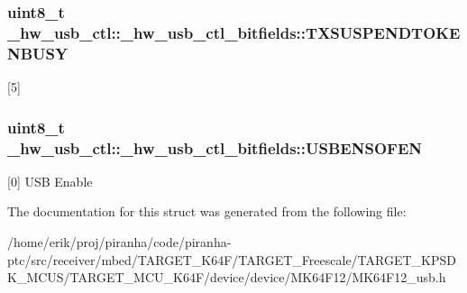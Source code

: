 \subsubsection[{\texorpdfstring{T\+X\+S\+U\+S\+P\+E\+N\+D\+T\+O\+K\+E\+N\+B\+U\+SY}{TXSUSPENDTOKENBUSY}}]{\setlength{\rightskip}{0pt plus 5cm}uint8\+\_\+t \+\_\+hw\+\_\+usb\+\_\+ctl\+::\+\_\+hw\+\_\+usb\+\_\+ctl\+\_\+bitfields\+::\+T\+X\+S\+U\+S\+P\+E\+N\+D\+T\+O\+K\+E\+N\+B\+U\+SY}\hypertarget{struct__hw__usb__ctl_1_1__hw__usb__ctl__bitfields_a598e5316f44ae034098ae7c047238770}{}\label{struct__hw__usb__ctl_1_1__hw__usb__ctl__bitfields_a598e5316f44ae034098ae7c047238770}
\mbox{[}5\mbox{]} 
\subsubsection[{\texorpdfstring{U\+S\+B\+E\+N\+S\+O\+F\+EN}{USBENSOFEN}}]{\setlength{\rightskip}{0pt plus 5cm}uint8\+\_\+t \+\_\+hw\+\_\+usb\+\_\+ctl\+::\+\_\+hw\+\_\+usb\+\_\+ctl\+\_\+bitfields\+::\+U\+S\+B\+E\+N\+S\+O\+F\+EN}\hypertarget{struct__hw__usb__ctl_1_1__hw__usb__ctl__bitfields_aec8cd251acc2ef4f7d8863919c100a56}{}\label{struct__hw__usb__ctl_1_1__hw__usb__ctl__bitfields_aec8cd251acc2ef4f7d8863919c100a56}
\mbox{[}0\mbox{]} U\+SB Enable 

The documentation for this struct was generated from the following file\+:\begin{DoxyCompactItemize}
\item 
/home/erik/proj/piranha/code/piranha-\/ptc/src/receiver/mbed/\+T\+A\+R\+G\+E\+T\+\_\+\+K64\+F/\+T\+A\+R\+G\+E\+T\+\_\+\+Freescale/\+T\+A\+R\+G\+E\+T\+\_\+\+K\+P\+S\+D\+K\+\_\+\+M\+C\+U\+S/\+T\+A\+R\+G\+E\+T\+\_\+\+M\+C\+U\+\_\+\+K64\+F/device/device/\+M\+K64\+F12/M\+K64\+F12\+\_\+usb.\+h\end{DoxyCompactItemize}
